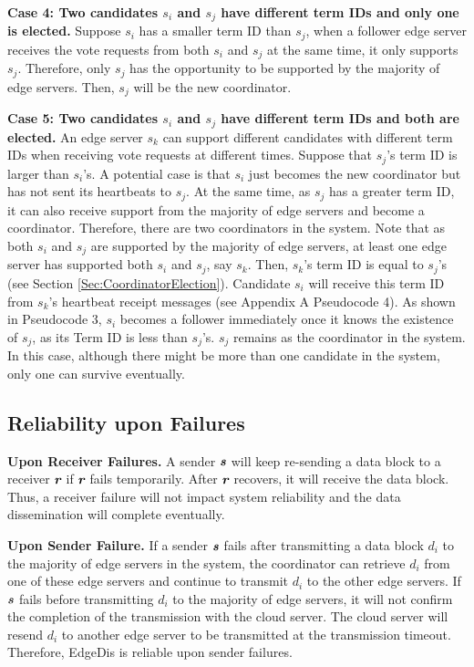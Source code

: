 \documentclass[10pt,journal,compsoc]{IEEEtran}
\def\mathbi#1{\textbf{\em #1}}
\begin{document}
\smallskip
\textbf{Case 4: Two candidates $s_i$ and $s_j$ have different term IDs and only one is elected. } Suppose $s_i$ has a smaller term ID than $s_j$, when a follower edge server receives the vote requests from both $s_i$ and $s_j$ at the same time, it only supports $s_j$. Therefore, only $s_j$ has the opportunity to be supported by the majority of edge servers. Then, $s_j$ will be the new coordinator. 

\smallskip
\textbf{Case 5: Two candidates $s_i$ and $s_j$ have different term IDs and both are elected.} An edge server $s_k$ can support different candidates with different term IDs when receiving vote requests at different times. Suppose that $s_j$'s term ID is larger than $s_i$'s. A potential case is that  $s_i$ just becomes the new coordinator but has not sent its heartbeats to $s_j$. At the same time, as $s_j$ has a greater term ID, it can also receive support from the majority of edge servers and become a coordinator. Therefore, there are two coordinators in the system. Note that as both $s_i$ and $s_j$ are supported by the majority of edge servers, at least one edge server has supported both $s_i$ and $s_j$, say $s_k$. Then, $s_k$'s term ID is equal to $s_j$'s (see Section \ref{Sec:CoordinatorElection}). Candidate $s_i$ will receive this term ID from $s_k$'s heartbeat receipt messages (see Appendix A Pseudocode 4). As shown in Pseudocode 3, $s_i$ becomes a follower immediately once it knows the existence of $s_j$, as its Term ID is less than $s_j$'s. $s_j$ remains as the coordinator in the system. In this case, although there might be more than one candidate in the system, only one can survive eventually.
    




\subsection{Reliability upon Failures}

\label{subSection:Safety_CoordinatorFailure}

\smallskip
\textbf{Upon Receiver Failures.} A sender $\mathbi{s}$ will keep re-sending a data block to a receiver $\mathbi{r}$ if $\mathbi{r}$ fails temporarily. After $\mathbi{r}$ recovers, it will receive the data block. Thus, a receiver failure will not impact system reliability and the data dissemination will complete eventually.

\smallskip
\textbf{Upon Sender Failure.} If a sender $\mathbi{s}$ fails after transmitting a data block $d_i$ to the majority of edge servers in the system, the coordinator can retrieve $d_i$ from one of these edge servers and continue to transmit $d_i$ to the other edge servers. If $\mathbi{s}$ fails before transmitting $d_i$ to the majority of edge servers, it will not confirm the completion of the transmission with the cloud server. The cloud server will resend $d_i$ to another edge server to be transmitted at the transmission timeout. Therefore, EdgeDis is reliable upon sender failures.
\end{document}
